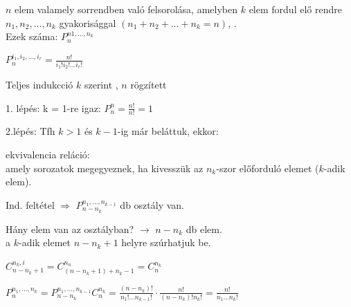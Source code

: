 \begin{frame}
  \begin{tcolorbox}[title={Def.: Ismétléses Permutáció}]
      $n$ elem valamely sorrendben való felsorolása, amelyben $k$ elem fordul elő rendre $n_1, n_2, ..., n_k$ gyakorisággal $(n_1 + n_2 + ... + n_k = n)$, .\\
      Ezek száma: $P_n^{n1, ..., n_k}$
  \end{tcolorbox}

  \begin{tcolorbox}[title={Tétel: Ismétléses permutációk száma}]
    $P_n^{i_1, i_2, ..., i_r} = \frac{n!}{i_1!i_2!...i_r!}$
  \tcblower
    \\
    \mmedskip

    Teljes indukcció $k$ szerint , $n$ rögzített\\
    \mmedskip

    1. lépés: k = 1-re igaz: $P_n^n = \frac{n!}{n!} = 1$\\
    \mbigskip

    2.lépés: Tfh $k > 1$ és $k - 1$-ig már beláttuk, ekkor:\\
    \msmallskip

    ekvivalencia reláció:\\
    amely sorozatok megegyeznek, ha kivesszük az $n_k$-szor előforduló elemet ($k$-adik elem).\\
    \msmallskip

    Ind. feltétel $\Rightarrow$ $P_{n - n_k}^{n_1, ..., n_{k - 1}}$ db osztály van.\\
    \msmallskip

    Hány elem van az osztályban? $\rightarrow$ $n - n_k$ db elem.\\
    a $k$-adik elemet $n - n_k + 1$ helyre szúrhatjuk be.\\
    \mmedskip

    $C_{n - n_k + 1}^{n_k, i} = C^{n_n}_{(n - n_k + 1) + n_k - 1} = C_n^{n_k}$\\
    \mmedskip

    $P_n^{n_1, ..., n_k} = P_{n - n_k}^{n_1, ..., n_{k - 1}} C_n^{n_k} = \frac{(n - n_k)!}{n_1!...n_{k - 1}!} \cdot \frac{n!}{(n - n_k)!n_k!} = \frac{n!}{n_1...n_k!}$
  \end{tcolorbox}
\end{frame}


